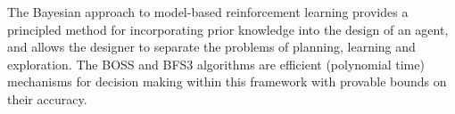 The Bayesian approach to model-based reinforcement learning provides a principled method for incorporating prior knowledge into the design of an agent, and allows the designer to separate the problems of planning, learning and exploration.  The BOSS and BFS3 algorithms are efficient (polynomial time) mechanisms for decision making within this framework with provable bounds on their accuracy.

